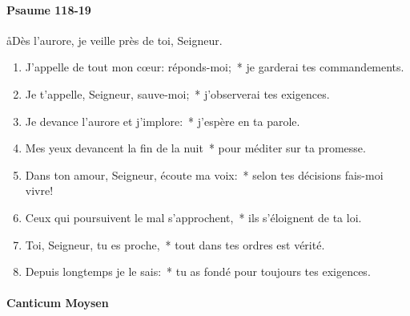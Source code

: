 \documentclass[twoside]{article}
\begin{document}
\begin{paracol}[1]{2}
\switchcolumn


\paragraph{Psaume 118-19}

\aa Dès l’aurore, je veille près de toi, Seigneur.


\begin{enumerate}[wide, itemsep=0mm, labelwidth=!, labelindent=0pt, label=\color{gregoriocolor}\theenumi]
\item J’appelle de tout mon cœur: réponds-moi;~* je garderai tes commandements.
\item Je t’appelle, Seigneur, sauve-moi;~* j’observerai tes exigences.
\item Je devance l’aurore et j’implore:~* j’espère en ta parole.
\item Mes yeux devancent la fin de la nuit~* pour méditer sur ta promesse.
\item Dans ton amour, Seigneur, écoute ma voix:~* selon tes décisions fais-moi vivre!
\item Ceux qui poursuivent le mal s’approchent,~* ils s’éloignent de ta loi.
\item Toi, Seigneur, tu es proche,~* tout dans tes ordres est vérité.
\item Depuis longtemps je le sais:~* tu as fondé pour toujours tes exigences.
\end{enumerate}
\newpage
\switchcolumn*
\paragraph{Canticum Moysen}




\end{paracol}
\end{document}
